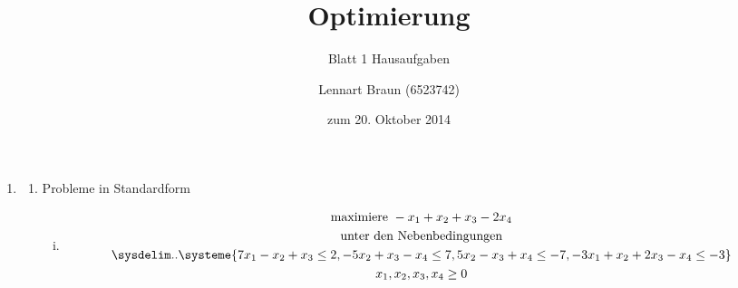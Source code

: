 \documentclass[a4paper]{scrartcl}
\title{Optimierung}
\subtitle{Blatt 1 Hausaufgaben}
\author{
	Lennart Braun (6523742) \\
}
\date{zum 20. Oktober 2014}
\begin{document}
\maketitle

\begin{enumerate}
    \item %
        \begin{enumerate}
            \item Probleme in Standardform
                \begin{enumerate}[(i)]
                    \item
                        \begin{equation}
                            \begin{gathered}
                                \text{maximiere } -x_1 + x_2 + x_3 - 2x_4 \\
                                \text{unter den Nebenbedingungen} \\
                                \sysdelim..\systeme{%
                                    7x_1 -x_2 +x_3 \leq 2,
                                    -5x_2 +x_3 -x_4 \leq 7,
                                    5x_2 -x_3 +x_4 \leq -7,
                                    -3x_1 +x_2 +2x_3 -x_4 \leq -3
                                } \\
                                x_1, x_2, x_3, x_4 \geq 0
                            \end{gathered}
                        \end{equation}
                        

\end{enumerate}
\end{enumerate}
\end{enumerate}
\end{document}
